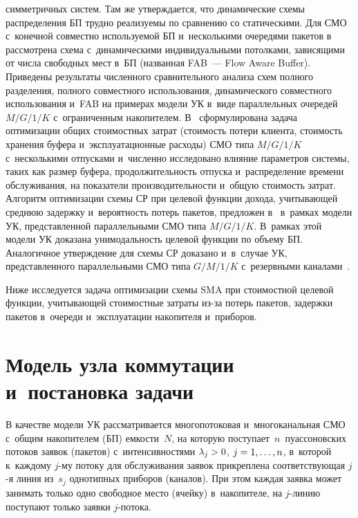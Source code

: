 \begin{multicols}{2}
сим\-мет\-рич\-ных сис\-тем. Там же утверж\-да\-ет\-ся, что динамические схемы 
рас\-пре\-де\-ле\-ния БП труд\-но ре\-а\-ли\-зу\-емы по срав\-не\-нию со статическими. Для 
СМО с~конечной совместно ис\-поль\-зу\-емой БП и~несколькими очередями 
пакетов в~\cite{14-ag} рас\-смот\-ре\-на схема с~динамическими индивидуальными 
потолками, зависящими от чис\-ла свободных мест в~БП (названная FAB~--- Flow 
Aware Buffer). Приведены результаты чис\-лен\-но\-го срав\-ни\-тель\-но\-го анализа схем 
пол\-но\-го разделения, полного совместного использования, динамического 
совместного использования и~FAB на примерах модели УК в~виде 
параллельных очередей $M/G/1/K$ с~ограниченным накопителем.  
В~\cite{15-ag} сформулирована задача оптимизации общих стоимостных затрат 
(сто\-и\-мость потери клиента, сто\-и\-мость хранения буфера и~эксплуатационные 
расходы) СМО типа $M/G/1/K$ с~несколькими отпусками и~чис\-лен\-но 
исследовано влияние па\-ра\-мет\-ров сис\-те\-мы, таких как раз\-мер буфера, 
про\-дол\-жи\-тель\-ность отпуска и~рас\-пре\-де\-ле\-ние времени обслуживания, на 
показатели про\-из\-во\-ди\-тель\-ности и~общую сто\-и\-мость затрат. Алгоритм 
оптимизации схемы СР при целевой функции дохода, учи\-ты\-ва\-ющей сред\-нюю 
за\-держ\-ку и~ве\-ро\-ят\-ность потерь пакетов, пред\-ло\-жен в~\cite{16-ag} в~рамках 
модели УК, пред\-став\-лен\-ной параллельными СМО типа $M/G/1/K$. В~рамках 
этой модели УК доказана уни\-мо\-даль\-ность целевой функции по объему БП. 
Аналогичное утверж\-де\-ние для схемы СР доказано и~в~случае УК, 
пред\-став\-лен\-но\-го параллельными СМО типа $G/M/1/K$ с~резервными 
каналами~\cite{17-ag}. 
  
  Ниже исследуется задача оптимизации схемы SMA при стоимостной целевой 
функции, учи\-ты\-ва\-ющей стоимостные за\-тра\-ты из-за потерь пакетов, за\-держ\-ки 
пакетов в~очереди и~эксплуатации накопителя и~при\-бо\-ров.
  
  \section{Модель узла коммутации и~постановка задачи}
  
  В качестве модели УК рассматривается многопотоковая и~многоканальная 
СМО с~общим накопителем (БП) ем\-кости~$N$, на которую 
по\-сту\-па\-ет~$n$~пуассоновских потоков заявок (пакетов) с~\mbox{интенсивностями} 
$\lambda_j\hm>0$, $j\hm= 1,\ldots , n$, в~которой к~каж\-до\-му $j$-му потоку для 
обслуживания заявок прикреплена со\-от\-вет\-ст\-ву\-ющая $j$-я линия из~$s_j$ 
однотипных приборов (каналов). При этом каж\-дая заявка может занимать 
только од\-но свободное мес\-то (ячейку) в~накопителе, на $j$-ли\-нию по\-сту\-па\-ют 
толь\-ко заявки $j$-по\-тока. 
  

\end{multicols}
